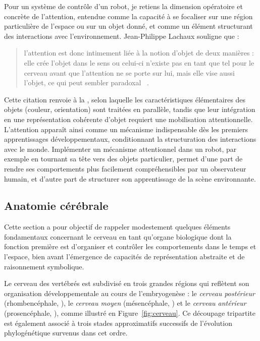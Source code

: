 Pour un système de contrôle d'un robot, je retiens la dimension opératoire et concrète de l'attention, entendue comme la capacité à se focaliser sur une région particulière de l'espace ou sur un objet donné, et comme un élément structurant des interactions avec l'environnement. 
Jean-Philippe Lachaux souligne que :
\begin{quote}
	\og l'attention est donc intimement liée à la notion d'objet de deux manières : elle crée l'objet dans le sens ou celui-ci n'existe pas en tant que tel pour le cerveau avant que l'attention ne se porte sur lui, mais elle vise aussi l'objet, ce qui peut sembler paradoxal \fg\
	\cite[p.~91]{lachaux_cerveau_2013}.
\end{quote}

Cette citation renvoie à la  \cite{treisman_feature-integration_1980}, selon laquelle les caractéristiques élémentaires des objets (couleur, orientation)  sont traitées en parallèle, tandis que leur intégration en une représentation cohérente d’objet requiert une mobilisation attentionnelle. 
L’attention apparaît ainsi comme un mécanisme indispensable dès les premiers apprentissages développementaux, conditionnant la structuration des interactions avec le monde.
Implémenter un mécanisme attentionnel dans un robot, par exemple en tournant sa tête vers des objets particulier,  permet d'une part de rendre ses comportements plus facilement compréhensibles par un observateur humain, et d'autre part de structurer son apprentissage de la scène environnante.

\subsection{Anatomie cérébrale}
\label{sec:anatomie}

\noindent
Cette section a pour objectif de rappeler modestement quelques éléments fondamentaux concernant le cerveau en tant qu’organe biologique dont la fonction première est d’organiser et contrôler les comportements dans le temps et l’espace, bien avant l’émergence de capacités de représentation abstraite et de raisonnement symbolique.

Le cerveau des vertébrés est subdivisé en trois grandes régions qui reflètent son organisation développementale au cours de l'embryogenèse : le \emph{cerveau postérieur} (rhombencéphale, ), le \emph{cerveau moyen} (mésencéphale, ) et le \emph{cerveau antérieur} (prosencéphale, ), comme illustré en Figure~\ref{fig:cerveau}.
Ce découpage tripartite est également associé à trois stades approximatifs successifs de l’évolution phylogénétique survenus dans cet ordre. 

